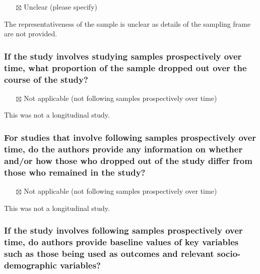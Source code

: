 \documentclass[
  doc, a4paper]{apa7}
\providecommand{\tightlist}{%
  \setlength{\itemsep}{0pt}\setlength{\parskip}{0pt}}
\begin{document}
\begin{itemize}
\tightlist
\item[$\boxtimes$]
  Unclear (please specify)
\end{itemize}

The representativeness of the sample is unclear as details of the sampling frame are not provided.

\subsubsection{If the study involves studying samples prospectively over time, what proportion of the sample dropped out over the course of the study?}\label{if-the-study-involves-studying-samples-prospectively-over-time-what-proportion-of-the-sample-dropped-out-over-the-course-of-the-study}

\begin{itemize}
\tightlist
\item[$\boxtimes$]
  Not applicable (not following samples prospectively over time)
\end{itemize}

This was not a longitudinal study.

\subsubsection{For studies that involve following samples prospectively over time, do the authors provide any information on whether and/or how those who dropped out of the study differ from those who remained in the study?}\label{for-studies-that-involve-following-samples-prospectively-over-time-do-the-authors-provide-any-information-on-whether-andor-how-those-who-dropped-out-of-the-study-differ-from-those-who-remained-in-the-study}

\begin{itemize}
\tightlist
\item[$\boxtimes$]
  Not applicable (not following samples prospectively over time)
\end{itemize}

This was not a longitudinal study.

\subsubsection{If the study involves following samples prospectively over time, do authors provide baseline values of key variables such as those being used as outcomes and relevant socio-demographic variables?}\label{if-the-study-involves-following-samples-prospectively-over-time-do-authors-provide-baseline-values-of-key-variables-such-as-those-being-used-as-outcomes-and-relevant-socio-demographic-variables}
\end{document}
